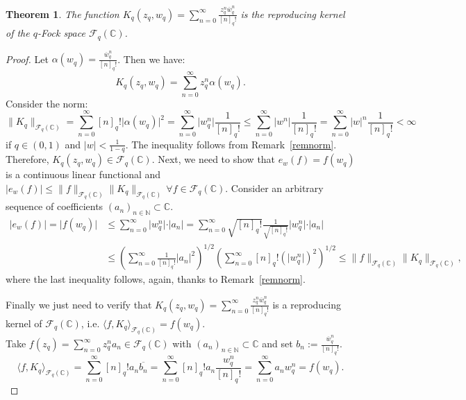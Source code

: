 \documentclass[10pt]{amsart}
\theoremstyle{plain}
\newtheorem{theorem}{Theorem}[section]
\theoremstyle{definition}
\renewcommand{\bar}[1]{\overline{#1}}
\begin{document}
\begin{theorem}
The function $K_q(z_{q},w_{q}) = \sum_{n=0}^{\infty} \frac{z_q^n\bar{w}_q^n}{[n]_q!}$ is the reproducing kernel of the $q$-Fock space $\mathcal{F}_q(\mathbb{C})$.
\end{theorem}
\begin{proof}
Let $\alpha(w_{q}) = \frac{\bar{w}_q^n}{[n]_q!}$. Then we have:
$$K_q(z_{q},w_{q}) = \sum_{n=0}^{\infty} z_q^n\alpha(w_{q}).$$
Consider the norm:
$$\lVert K_q \rVert_{\mathcal{F}_q(\mathbb{C})} = \sum_{n=0}^{\infty} [n]_q! \vert \alpha(w_{q}) \vert^2 = \sum_{n=0}^{\infty} \vert w_q^n\vert \frac{1}{[n]_q!} \leq \sum_{n=0}^\infty \vert w^n\vert\frac{1}{[n]_q!} = \sum_{n=0}^\infty \vert w \vert^n\frac{1}{[n]_q!} <\infty$$
if $q\in (0,1)$ and $\vert w \vert <\frac{1}{1-q}$. 
The inequality follows from Remark~\ref{remnorm}.
Therefore, $K_q(z_{q},w_{q}) \in \mathcal{F}_q(\mathbb{C})$.
Next, we need to show that $e_w(f) = f(w_{q})$ is a continuous linear functional and $\vert e_w(f)\vert \leq \lVert f \rVert_{\mathcal{F}_q(\mathbb{C})} \lVert K_q \rVert_{\mathcal{F}_q(\mathbb{C})} \, \forall f\in \mathcal{F}_q(\mathbb{C})$. Consider an arbitrary sequence of coefficients $(a_n)_{n\in\mathbb{N}} \subset \mathbb{C}$.
\begin{align*}
\vert e_w(f) \vert = \vert f(w_{q}) \vert &\leq \sum_{n=0}^{\infty} \vert w_q^n\vert \cdot \vert a_n \vert= \sum_{n=0}^{\infty} \sqrt{[n]_q!}\frac{1}{\sqrt{[n]_q!}}\vert w_q^n\vert\cdot \vert a_n\vert\\
&\leq \left( \sum_{n=0}^{\infty} \frac{1}{[n]_q!}\vert a_n \vert^2\right)^{1/2}\left(\sum_{n=0}^{\infty} [n]_q! (\vert w_q^n \vert)^2\right)^{1/2}\leq \lVert f \rVert_{\mathcal{F}_q(\mathbb{C})} \lVert K_q \rVert_{\mathcal{F}_q(\mathbb{C})},
\end{align*}
where the last inequality follows, again, thanks to Remark~\ref{remnorm}.

Finally we just need to verify that $K_q(z_{q},w_{q}) = \sum_{n=0}^{\infty} \frac{z_q^n\bar{w}_q^n}{[n]_q!}$ is a reproducing kernel of $\mathcal{F}_q(\mathbb{C})$, i.e. $\langle f, K_q \rangle_{\mathcal{F}_q(\mathbb{C})} = f(w_{q})$.\\
Take $f(z_{q}) = \sum_{n=0}^{\infty} z_q^n a_n \in \mathcal{F}_q(\mathbb{C})$ with $(a_n)_{n\in\mathbb{N}} \subset\mathbb{C}$ and set $b_n := \frac{\bar{w}_q^n}{[n]_q!}$.
$$
\langle f,K_q \rangle_{\mathcal{F}_q(\mathbb{C})} = \sum_{n=0}^{\infty} [n]_q! a_n\bar{b_n}= \sum_{n=0}^{\infty} [n]_q! a_n \frac{w_q^n}{[n]_q!}= \sum_{n=0}^{\infty} a_n w_q^n = f(w_{q}).
$$
\end{proof}
\end{document}
